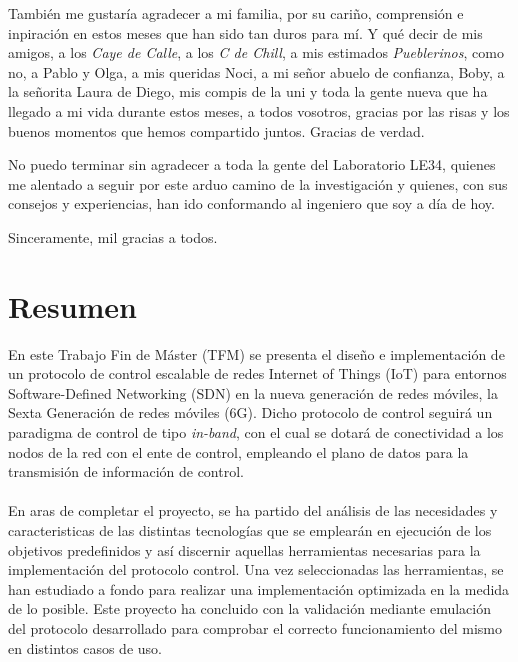 También me gustaría agradecer a mi familia, por su cariño, comprensión e inpiración en estos meses que han sido tan duros para mí. 	Y qué decir de mis amigos, a los \textit{Caye de Calle}, a los \textit{C de Chill},  a mis estimados \textit{Pueblerinos}, como no, a Pablo y Olga, a mis queridas Noci, a mi señor abuelo de confianza, Boby, a la señorita Laura de Diego, mis compis de la uni y toda la gente nueva que ha llegado a mi vida durante estos meses, a todos vosotros, gracias por las risas y los buenos momentos que hemos compartido juntos. Gracias de verdad. \newline


No puedo terminar sin agradecer a toda la gente del Laboratorio LE34, quienes me alentado a seguir por este arduo camino de la investigación y quienes, con sus consejos y experiencias, han ido conformando al ingeniero que soy a día de hoy.

\vspace{0.5cm}

Sinceramente, mil gracias a todos.




\cleardoublepage %



\chapter{Resumen}
\thispagestyle{empty}
En este Trabajo Fin de Máster (TFM) se presenta el diseño e implementación de un protocolo de control escalable de redes Internet of Things (IoT) para entornos Software-Defined Networking (SDN) en la nueva generación de redes móviles, la Sexta Generación de redes móviles (6G). Dicho protocolo de control seguirá un paradigma de control de tipo \textit{in-band}, con el cual se dotará de conectividad a los nodos de la red con el ente de control, empleando el plano de datos para la transmisión de información de control.\\
\\
En aras de completar el proyecto,  se ha partido del análisis de las necesidades y caracteristicas de las distintas tecnologías que se emplearán en ejecución de los objetivos predefinidos y así discernir aquellas herramientas necesarias para la implementación del protocolo control. Una vez seleccionadas las herramientas, se han estudiado a fondo para realizar una implementación optimizada en la medida de lo posible. Este proyecto ha concluido con la validación mediante emulación del protocolo desarrollado para comprobar el correcto funcionamiento del mismo en distintos casos de uso.

